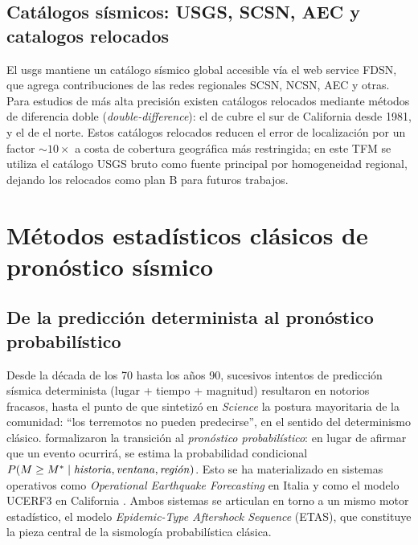 \subsection{Catálogos sísmicos: USGS, SCSN, AEC y catalogos relocados}
\label{catalogos}

El \gls{usgs} mantiene un catálogo sísmico global accesible vía el web service FDSN, que agrega contribuciones de las redes regionales SCSN, NCSN, AEC y otras. Para estudios de más alta precisión existen catálogos relocados mediante métodos de diferencia doble (\textit{double-difference}): el de \citet{hauksson2012relocated} cubre el sur de California desde 1981, y el de \citet{waldhauser2008doubledifference} el norte. Estos catálogos relocados reducen el error de localización por un factor $\sim 10\times$ a costa de cobertura geográfica más restringida; en este TFM se utiliza el catálogo USGS bruto como fuente principal por homogeneidad regional, dejando los relocados como plan B para futuros trabajos.

\section{Métodos estadísticos clásicos de pronóstico sísmico}
\label{metodos-estadisticos-clasicos}

\subsection{De la predicción determinista al pronóstico probabilístico}
\label{prediccion-vs-pronostico}

Desde la década de los 70 hasta los años 90, sucesivos intentos de predicción sísmica determinista (lugar + tiempo + magnitud) resultaron en notorios fracasos, hasta el punto de que \citet{geller1997unpredictable} sintetizó en \textit{Science} la postura mayoritaria de la comunidad: ``los terremotos no pueden predecirse'', en el sentido del determinismo clásico. \citet{jordan2011oef} formalizaron la transición al \emph{pronóstico probabilístico}: en lugar de afirmar que un evento ocurrirá, se estima la probabilidad condicional $P(M \geq M^* \mid \text{\emph{historia}}, \text{\emph{ventana}}, \text{\emph{región}})$. Esto se ha materializado en sistemas operativos como \emph{Operational Earthquake Forecasting} en Italia \citep{marzocchi2014oef} y como el modelo UCERF3 en California \citep{field2014ucerf3, field2017ucerf3etas}. Ambos sistemas se articulan en torno a un mismo motor estadístico, el modelo \emph{Epidemic-Type Aftershock Sequence} (ETAS), que constituye la pieza central de la sismología probabilística clásica.

